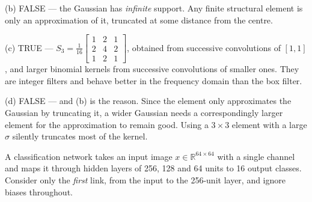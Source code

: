 \documentclass[11pt]{exam}
\newcommand{\answerspace}[1]{\ifprintanswers\else\vspace{#1}\fi}
\begin{document}
\begin{questions}
\begin{solution}
  (b) FALSE --- the Gaussian has \emph{infinite} support. Any finite structural element is only an
  approximation of it, truncated at some distance from the centre.

  (c) TRUE --- $S_3 = \frac{1}{16}\left[\begin{smallmatrix}1&2&1\\2&4&2\\1&2&1\end{smallmatrix}
  \right]$, obtained from successive convolutions of $[1,1]$, and larger binomial kernels from
  successive convolutions of smaller ones. They are integer filters and behave better in the
  frequency domain than the box filter.

  (d) FALSE --- and (b) is the reason. Since the element only approximates the Gaussian by
  truncating it, a wider Gaussian needs a correspondingly larger element for the approximation to
  remain good. Using a $3 \times 3$ element with a large $\sigma$ silently truncates most of the
  kernel.
\end{solution}

\question
A classification network takes an input image $x \in \mathbb{R}^{64 \times 64}$ with a single
channel and maps it through hidden layers of 256, 128 and 64 units to 16 output classes. Consider
only the \emph{first} link, from the input to the 256-unit layer, and ignore biases throughout.

\end{questions}
\end{document}
